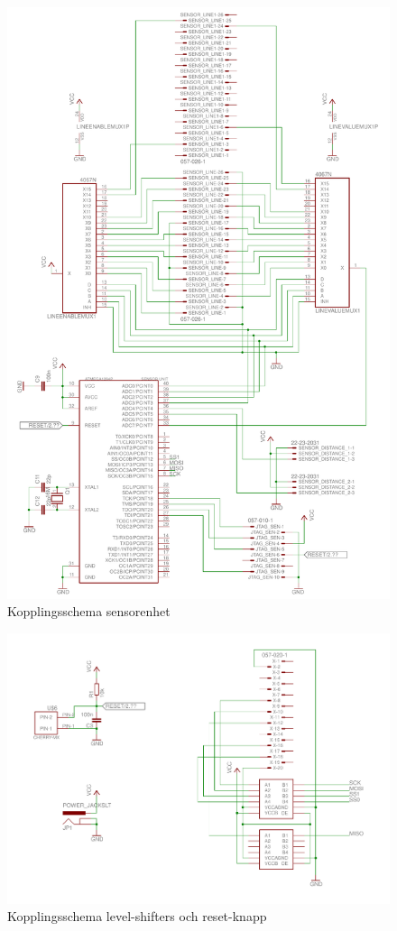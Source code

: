 \begin{figure}[h!]
	\centering
	\includegraphics[scale=0.5]{grafik/kopplingsschema-sensor_unit}
	\caption{Kopplingsschema sensorenhet} \label{kopplingsschema-sensor}
\end{figure}

\begin{figure}[h!]
	\centering
	\includegraphics[scale=0.4]{grafik/kopplingsschema-level_shifters}
	\caption{Kopplingsschema level-shifters och reset-knapp} \label{kopplingsschema-levelshifter}
\end{figure}


